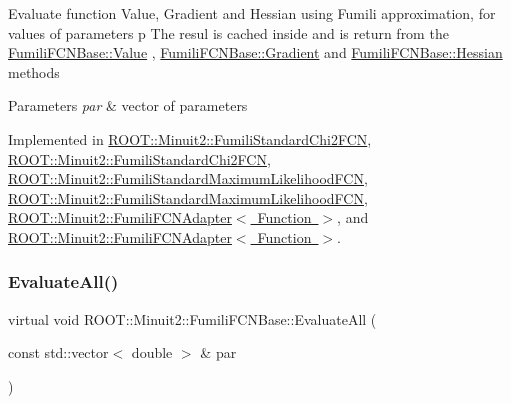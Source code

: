 Evaluate function Value, Gradient and Hessian using Fumili approximation, for values of parameters p The resul is cached inside and is return from the \mbox{\hyperlink{classROOT_1_1Minuit2_1_1FumiliFCNBase_a221dacee0ccde747a271a0cecd759f98}{Fumili\+F\+C\+N\+Base\+::\+Value}} , \mbox{\hyperlink{classROOT_1_1Minuit2_1_1FumiliFCNBase_ad226939ea2e83f754b5a6afc30876d3e}{Fumili\+F\+C\+N\+Base\+::\+Gradient}} and \mbox{\hyperlink{classROOT_1_1Minuit2_1_1FumiliFCNBase_ade134d8c6613393e942ef98d445db376}{Fumili\+F\+C\+N\+Base\+::\+Hessian}} methods


\begin{DoxyParams}{Parameters}
{\em par} & vector of parameters \\
\hline
\end{DoxyParams}


Implemented in \mbox{\hyperlink{classROOT_1_1Minuit2_1_1FumiliStandardChi2FCN_a76f42b6e5d2a92961a9fd8feca38b582}{R\+O\+O\+T\+::\+Minuit2\+::\+Fumili\+Standard\+Chi2\+F\+CN}}, \mbox{\hyperlink{classROOT_1_1Minuit2_1_1FumiliStandardChi2FCN_ace15dd1aad435e460c523bc37bff12a8}{R\+O\+O\+T\+::\+Minuit2\+::\+Fumili\+Standard\+Chi2\+F\+CN}}, \mbox{\hyperlink{classROOT_1_1Minuit2_1_1FumiliStandardMaximumLikelihoodFCN_a1faea776f7da3c238e522748b573caab}{R\+O\+O\+T\+::\+Minuit2\+::\+Fumili\+Standard\+Maximum\+Likelihood\+F\+CN}}, \mbox{\hyperlink{classROOT_1_1Minuit2_1_1FumiliStandardMaximumLikelihoodFCN_a37e72fc87092e5699066098fa5a31235}{R\+O\+O\+T\+::\+Minuit2\+::\+Fumili\+Standard\+Maximum\+Likelihood\+F\+CN}}, \mbox{\hyperlink{classROOT_1_1Minuit2_1_1FumiliFCNAdapter_a75bacae09c510900a45ea753afae971a}{R\+O\+O\+T\+::\+Minuit2\+::\+Fumili\+F\+C\+N\+Adapter$<$ Function $>$}}, and \mbox{\hyperlink{classROOT_1_1Minuit2_1_1FumiliFCNAdapter_a75bacae09c510900a45ea753afae971a}{R\+O\+O\+T\+::\+Minuit2\+::\+Fumili\+F\+C\+N\+Adapter$<$ Function $>$}}.

\mbox{\label{classROOT_1_1Minuit2_1_1FumiliFCNBase_a0741bb4a7405cc33ab60583472a189cb}} 
\subsubsection{\texorpdfstring{EvaluateAll()}{EvaluateAll()}\hspace{0.1cm}{\footnotesize\ttfamily [2/2]}}
{\footnotesize\ttfamily virtual void R\+O\+O\+T\+::\+Minuit2\+::\+Fumili\+F\+C\+N\+Base\+::\+Evaluate\+All (\begin{DoxyParamCaption}\item[{const std\+::vector$<$ double $>$ \&}]{par }\end{DoxyParamCaption})\hspace{0.3cm}{\ttfamily [pure virtual]}}

